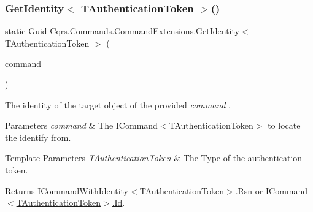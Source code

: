 \subsubsection{\texorpdfstring{Get\+Identity$<$ T\+Authentication\+Token $>$()}{GetIdentity< TAuthenticationToken >()}}
{\footnotesize\ttfamily static Guid Cqrs.\+Commands.\+Command\+Extensions.\+Get\+Identity$<$ T\+Authentication\+Token $>$ (\begin{DoxyParamCaption}\item[{this \hyperlink{interfaceCqrs_1_1Commands_1_1ICommand}{I\+Command}$<$ T\+Authentication\+Token $>$}]{command }\end{DoxyParamCaption})\hspace{0.3cm}{\ttfamily [static]}}



The identity of the target object of the provided {\itshape command} . 


\begin{DoxyParams}{Parameters}
{\em command} & The I\+Command$<$\+T\+Authentication\+Token$>$ to locate the identify from.\\
\hline
\end{DoxyParams}

\begin{DoxyTemplParams}{Template Parameters}
{\em T\+Authentication\+Token} & The Type of the authentication token.\\
\hline
\end{DoxyTemplParams}
\begin{DoxyReturn}{Returns}
\hyperlink{interfaceCqrs_1_1Commands_1_1ICommandWithIdentity_ae3a9a077d39c0b87d8bf0f3fa44fd8cd_ae3a9a077d39c0b87d8bf0f3fa44fd8cd}{I\+Command\+With\+Identity$<$\+T\+Authentication\+Token$>$.\+Rsn} or \hyperlink{interfaceCqrs_1_1Commands_1_1ICommand_a79acca2013a08295cef32f1917d97e96_a79acca2013a08295cef32f1917d97e96}{I\+Command$<$\+T\+Authentication\+Token$>$.\+Id}.
\end{DoxyReturn}
